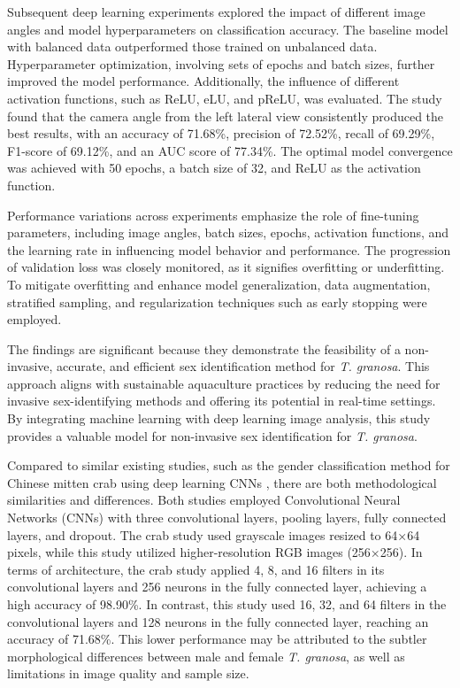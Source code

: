Subsequent deep learning experiments explored the impact of different image angles and model hyperparameters on classification accuracy. The baseline model with balanced data outperformed those trained on unbalanced data. Hyperparameter optimization,  involving sets of epochs and batch sizes, further improved the model performance. Additionally, the influence of different activation functions, such as ReLU, eLU, and pReLU, was evaluated. The study found that the camera angle from the left lateral view consistently produced the best results, with an accuracy of 71.68\%, precision of 72.52\%, recall of 69.29\%, F1-score of 69.12\%, and an AUC score of 77.34\%. The optimal model convergence was achieved with 50 epochs, a batch size of 32, and ReLU as the activation function. 

Performance variations across experiments emphasize the role of fine-tuning parameters, including image angles, batch sizes, epochs, activation functions, and the learning rate in influencing model behavior and performance. The progression of validation loss was closely monitored, as it signifies overfitting or underfitting. To mitigate overfitting and enhance model generalization, data augmentation, stratified sampling, and regularization techniques such as early stopping were employed.

The findings are significant because they demonstrate the feasibility of a non-invasive, accurate, and efficient sex identification method for \textit{T. granosa}. This approach aligns with sustainable aquaculture practices by reducing the need for invasive sex-identifying methods and offering its potential in real-time settings. By integrating machine learning with deep learning image analysis, this study provides a valuable model for non-invasive sex identification for \textit{T. granosa}.

Compared to similar existing studies, such as the gender classification method for Chinese mitten crab using deep learning CNNs \cite{cui2020}, there are both methodological similarities and differences. Both studies employed Convolutional Neural Networks (CNNs) with three convolutional layers, pooling layers, fully connected layers, and dropout. The crab study used grayscale images resized to 64×64 pixels, while this study utilized higher-resolution RGB images (256×256). In terms of architecture, the crab study applied 4, 8, and 16 filters in its convolutional layers and 256 neurons in the fully connected layer, achieving a high accuracy of 98.90\%. In contrast, this study used 16, 32, and 64 filters in the convolutional layers and 128 neurons in the fully connected layer, reaching an accuracy of 71.68\%. This lower performance may be attributed to the subtler morphological differences between male and female \textit{T. granosa}, as well as limitations in image quality and sample size.
	
